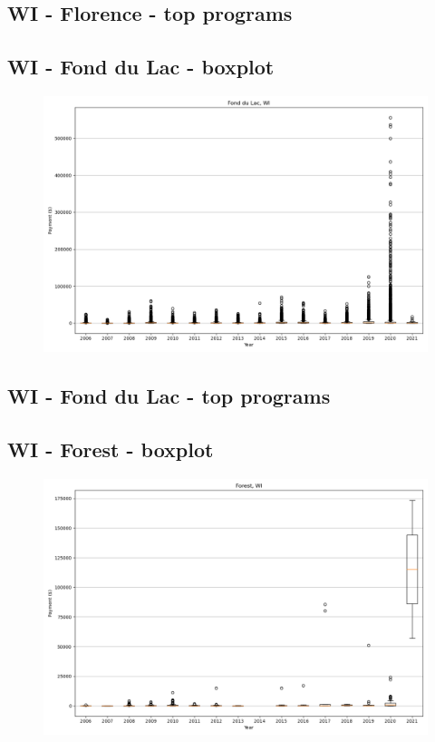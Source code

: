 \subsection*{WI - Florence - top programs}

\newpage
\subsection*{WI - Fond du Lac - boxplot}
\begin{figure}[h]
\centering
\includegraphics[width=7in]{../output/boxplots/counties/Fond du Lac-WI_boxplot.png}
\end{figure}


\subsection*{WI - Fond du Lac - top programs}

\newpage
\subsection*{WI - Forest - boxplot}
\begin{figure}[h]
\centering
\includegraphics[width=7in]{../output/boxplots/counties/Forest-WI_boxplot.png}
\end{figure}


